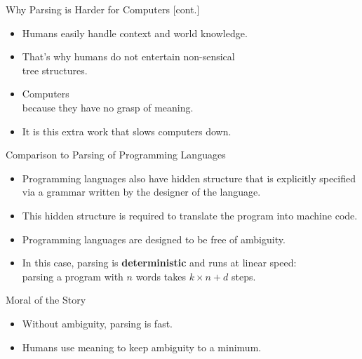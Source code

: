 \documentclass[xcolor={usenames,svgnames,x11names,dvipsnames,table}]{beamer}
\begin{document}
\begin{frame}{Why Parsing is Harder for Computers [cont.]}
    \begin{itemize}
        \item Humans easily handle context and world knowledge.
        \item That's why humans do not entertain non-sensical\\ tree structures.
        \item Computers \\
            because they have no grasp of meaning. 
        \item It is this extra work that slows computers down.
    \end{itemize}
\end{frame}


\begin{frame}{Comparison to Parsing of Programming Languages}
    \begin{itemize}
        \item Programming languages also have hidden structure that is explicitly specified via a grammar written by the designer of the language.
        \item This hidden structure is required to translate the program into machine code.
        \item Programming languages are designed to be free of ambiguity.
        \item In this case, parsing is \textbf{deterministic} and runs at linear speed:\\ parsing a program with $n$ words takes $k \times n + d$ steps.
    \end{itemize}

    \begin{block}{Moral of the Story}
        \begin{itemize}
            \item Without ambiguity, parsing is fast.
            \item Humans use meaning to keep ambiguity to a minimum.
        \end{itemize}
    \end{block}
\end{frame}
\end{document}
